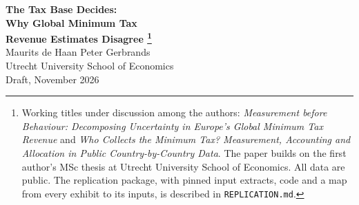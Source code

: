 \documentclass[11pt,a4paper]{article}
\begin{document}
\thispagestyle{plain}
\begin{center}
  {\LARGE\bfseries The Tax Base Decides:\\[0.2em] Why Global Minimum Tax\\[0.1em] Revenue Estimates Disagree%
  \footnote{Working titles under discussion among the authors: \emph{Measurement before Behaviour: Decomposing Uncertainty in Europe's Global Minimum Tax Revenue} and \emph{Who Collects the Minimum Tax? Measurement, Accounting and Allocation in Public Country-by-Country Data}. The paper builds on the first author's MSc thesis at Utrecht University School of Economics. All data are public. The replication package, with pinned input extracts, code and a map from every exhibit to its inputs, is described in \texttt{REPLICATION.md}.}}\\[1.2em]
  {\large Maurits de Haan \qquad Peter Gerbrands}\\[0.3em]
  {\small Utrecht University School of Economics}\\[0.3em]
  {\small Draft, November 2026}
\end{center}

\begin{abstract}
\noindent European governments have budgeted revenue from the Global Minimum Tax, yet published estimates for the same country differ by multiples. We trace that disagreement to its sources. Using public OECD country-by-country data for 2017–2023, we compute European revenue under every combination of six modelling decisions and attribute the variance across estimates to each decision. Two decisions dominate: how profit taxed below 15\% is measured and how accounting profit is translated into the minimum-tax base. Together they explain 82.6–89.7\% of the variance. Statistical uncertainty in estimated parameters accounts for 1.18\% or less, and profit-shifting responses shrink once a division bias in effective tax rates is removed. The accounting adjustments bring the preferred distributional specification closer to several national budget forecasts. Under the 2026 Side-by-Side package, repealing a domestic top-up tax becomes a tax cut for US-parented groups: 85.9\% of Ireland’s net forgone receipts corresponds to lower modelled liability for firms.

\medskip
\noindent\textbf{JEL codes:} H25, H87, F23, C54\\
\textbf{Keywords:} global minimum tax; Pillar Two; country-by-country reporting; revenue estimation; profit shifting; tax competition
\end{abstract}
\end{document}
